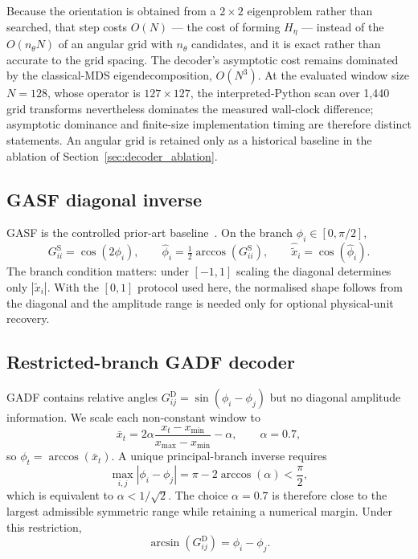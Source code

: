 \documentclass[5p]{elsarticle}
\begin{document}
Because the orientation is obtained from a \(2\times2\) eigenproblem rather than searched, that step costs \(O(N)\) --- the cost of forming \(H_\eta\) --- instead of the \(O(n_\theta N)\) of an angular grid with \(n_\theta\) candidates, and it is exact rather than accurate to the grid spacing. The decoder's asymptotic cost remains dominated by the classical-MDS eigendecomposition, \(O(N^3)\). At the evaluated window size \(N=128\), whose operator is \(127\times127\), the interpreted-Python scan over 1,440 grid transforms nevertheless dominates the measured wall-clock difference; asymptotic dominance and finite-size implementation timing are therefore distinct statements. An angular grid is retained only as a historical baseline in the ablation of Section~\ref{sec:decoder_ablation}.

\subsection{GASF diagonal inverse}\label{sec:gasf_reconstruction_method}

GASF is the controlled prior-art baseline~\cite{wang2015encoding}. On the branch \(\phi_i\in[0,\pi/2]\),
\[
G^{\mathrm S}_{ii}=\cos(2\phi_i),\qquad
\hat\phi_i=\tfrac12\arccos(G^{\mathrm S}_{ii}),\qquad
\hat{\tilde x}_i=\cos(\hat\phi_i).
\]
The branch condition matters: under \([-1,1]\) scaling the diagonal determines only \(|\tilde x_i|\). With the \([0,1]\) protocol used here, the normalised shape follows from the diagonal and the amplitude range is needed only for optional physical-unit recovery.

\subsection{Restricted-branch GADF decoder}\label{sec:gadf_reconstruction_proposal}

GADF contains relative angles \(G^{\mathrm D}_{ij}=\sin(\phi_i-\phi_j)\) but no diagonal amplitude information. We scale each non-constant window to
\[
\bar x_t=2\alpha\frac{x_t-x_{\min}}{x_{\max}-x_{\min}}-\alpha,
\qquad \alpha=0.7,
\]
so \(\phi_t=\arccos(\bar x_t)\). A unique principal-branch inverse requires
\[
\max_{i,j}|\phi_i-\phi_j|
=\pi-2\arccos(\alpha)<\frac{\pi}{2},
\]
which is equivalent to \(\alpha<1/\sqrt2\). The choice \(\alpha=0.7\) is therefore close to the largest admissible symmetric range while retaining a numerical margin. Under this restriction,
\[
\arcsin(G^{\mathrm D}_{ij})=\phi_i-\phi_j.
\]
\end{document}
